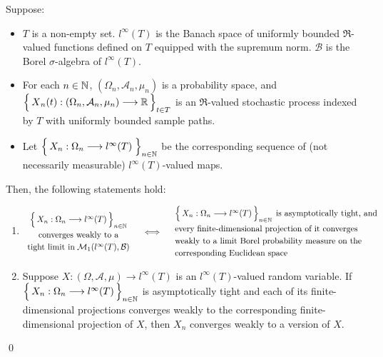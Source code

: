 \begin{theorem}
\mbox{}\vskip 0.1cm
\noindent
Suppose:
\begin{itemize}
\item
	$T$ is a non-empty set.
	$l^{\infty}(T)$ is the Banach space of uniformly bounded $\Re$-valued functions defined on $T$
	equipped with the supremum norm.
	$\mathcal{B}$ is the Borel $\sigma$-algebra of $l^{\infty}(T)$.
\item
	For each $n\in\mathbb{N}$, $(\Omega_{n},\mathcal{A}_{n},\mu_{n})$ is a probability space, and
	\,$\left\{\,\overset{{\color{white}.}}{X}_{n}(t):(\Omega_{n},\mathcal{A}_{n},\mu_{n})\longrightarrow\Re\,\right\}_{t\in T}$
	is an $\Re$-valued stochastic process indexed by $T$ with uniformly bounded sample paths.
\item
	Let $\left\{\,X_{n} : \Omega_{n}
	\overset{{\color{white}-}}{\longrightarrow}l^{\infty}(T)\;\right\}_{n\in\N}$
	be the corresponding sequence of (not necessarily measurable)
	$l^{\infty}(T)$-valued maps.
\end{itemize}
Then, the following statements hold:
\begin{enumerate}
\item
	\begin{equation*}
		\begin{array}{c}
			\left\{\,
			X_{n} : \Omega_{n}\overset{{\color{white}-}}{\longrightarrow}l^{\infty}(T)\,\right\}_{n\in\N}
		\\
			\overset{{\color{white}.}}{\textnormal{converges weakly to a}}
		\\
			\overset{{\color{white}.}}{\textnormal{tight limit in}}\; \mathcal{M}_{1}\!\left(l^{\infty}(T),\mathcal{B}\right)
		\end{array}
	\quad\Longleftrightarrow\quad
		\begin{array}{l}
			\left\{\,
			X_{n} : \Omega_{n}\overset{{\color{white}-}}{\longrightarrow}l^{\infty}(T)\,\right\}_{n\in\N}
			\;\textnormal{is asymptotically tight, and}
		\\
			\overset{{\color{white}.}}{\textnormal{every finite-dimensional projection of it converges}}
		\\
			\overset{{\color{white}.}}{\textnormal{weakly to a limit Borel probability measure on the}}
		\\
			\overset{{\color{white}.}}{\textnormal{corresponding Euclidean space}}
		\end{array}
	\end{equation*}
\item
	Suppose
	$X : (\Omega,\mathcal{A},\mu) \longrightarrow l^{\infty}(T)$
	is an $l^{\infty}(T)$-valued random variable.
	If
	\,$\left\{\,X_{n} : \Omega_{n}\overset{{\color{white}-}}{\longrightarrow}l^{\infty}(T)\,\right\}_{n\in\N}$
	is asymptotically tight and each of its finite-dimensional projections converges weakly to
	the corresponding finite-dimensional projection of $X$,
	then $X_{n}$ converges weakly to a version of $X$.
\end{enumerate}
\end{theorem}
\proof
\qed


\renewcommand{\theenumi}{\roman{enumi}}
\renewcommand{\labelenumi}{\textnormal{(\theenumi)}$\;\;$}

